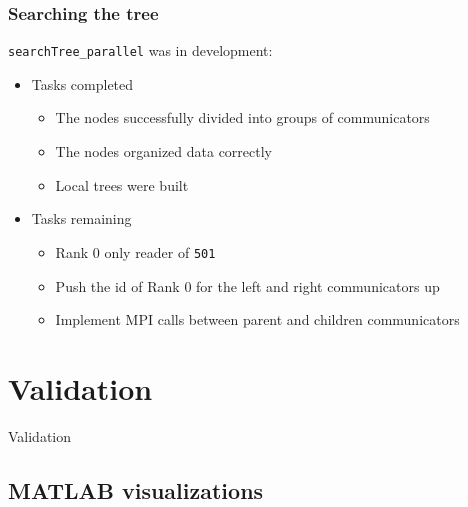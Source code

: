 \documentclass[usernames,dvipsnames]{beamer}
\begin{document}

\begin{frame}
	\frametitle{Searching the tree}
	
	\begin{block}{\texttt{searchTree\_parallel} was in development:}
	
	\begin{itemize}
	    \item Tasks completed
        	\begin{itemize}
        	    \item The nodes successfully divided into groups of communicators
        	    \item The nodes organized data correctly
        	    \item Local trees were built
        	\end{itemize}
        \item Tasks remaining
        	\begin{itemize}
        	    \item Rank 0 only reader of \texttt{501}
        	    \item Push the id of Rank 0 for the left and right communicators up
        	    \item Implement MPI calls between parent and children communicators
        	\end{itemize}
    \end{itemize}
\end{block}

\end{frame}



\section{Validation}

\begin{frame}	
	\begin{Huge}
		\begin{center}
			Validation
		\end{center}
	\end{Huge}
\end{frame}

\subsection{MATLAB visualizations}
\end{document}
